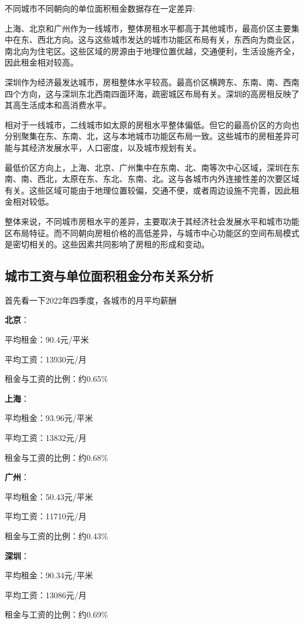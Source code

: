 \documentclass[lang=cn,11pt,a4paper]{elegantpaper}
\begin{document}
不同城市不同朝向的单位面积租金数据存在一定差异:

上海、北京和广州作为一线城市，整体房租水平都高于其他城市，最高价区主要集中在东、西北方向。这与这些城市发达的城市功能区布局有关，东西向为商业区，南北向为住宅区。这些区域的房源由于地理位置优越，交通便利，生活设施齐全，因此租金相对较高。

深圳作为经济最发达城市，房租整体水平较高。最高价区横跨东、东南、南、西南四个方向，这与深圳东北西南四面环海，疏密城区布局有关。深圳的高房租反映了其高生活成本和高消费水平。

相对于一线城市，二线城市如太原的房租水平整体偏低。但它的最高价区的方向也分别聚集在东、东南、北，这与本地城市功能区布局一致。这些城市的房租差异可能与其经济发展水平，人口密度，以及城市规划有关。

最低价区方向上，上海、北京、广州集中在东南、北、南等次中心区域，深圳在东南、南、西北，太原在东、东北、东南、北。这与各城市内外连接性差的次要区域有关。这些区域可能由于地理位置较偏，交通不便，或者周边设施不完善，因此租金相对较低。

整体来说，不同城市房租水平的差异，主要取决于其经济社会发展水平和城市功能区布局特征。而不同朝向房租价格的高低差异，与城市中心功能区的空间布局模式是密切相关的。这些因素共同影响了房租的形成和变动。

\subsection{城市工资与单位面积租金分布关系分析}

首先看一下2022年四季度，各城市的月平均薪酬

\textbf{北京}：

平均租金：90.4元/平米

平均工资：13930元/月

租金与工资的比例：约0.65\%

\textbf{上海}：

平均租金：93.96元/平米

平均工资：13832元/月

租金与工资的比例：约0.68\%

\textbf{广州}：

平均租金：50.43元/平米

平均工资：11710元/月

租金与工资的比例：约0.43\%

\textbf{深圳}：

平均租金：90.34元/平米

平均工资：13086元/月

租金与工资的比例：约0.69\%
\end{document}
